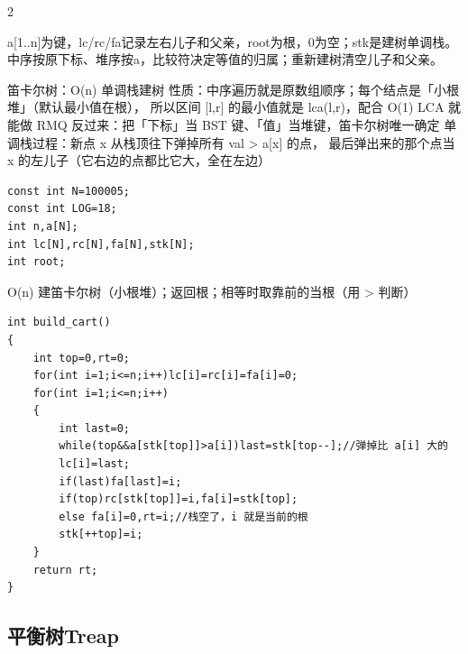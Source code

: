 \documentclass[UTF8,fontset=fandol,a4paper,twoside]{ctexart}
\newcommand{\note}[1]{{\fontsize{10}{12}\selectfont #1\par}}
\begin{document}
\begin{multicols}{2}
\note{a[\allowbreak{}1.\allowbreak{}.\allowbreak{}n]\allowbreak{}为键，lc/\allowbreak{}rc/\allowbreak{}fa记录左右儿子和父亲，root为根，0为空；stk是建树单调栈。中序按原下标、堆序按a，比较符决定等值的归属；重新建树清空儿子和父亲。}
\note{笛卡尔树：O(\allowbreak{}n)\allowbreak{} 单调栈建树 性质：中序遍历就是原数组顺序；每个结点是「小根堆」（默认最小值在根）， 所以区间 [\allowbreak{}l,\allowbreak{}r]\allowbreak{} 的最小值就是 lca(\allowbreak{}l,\allowbreak{}r)\allowbreak{}，配合 O(\allowbreak{}1)\allowbreak{} LCA 就能做 RMQ 反过来：把「下标」当 BST 键、「值」当堆键，笛卡尔树唯一确定 单调栈过程：新点 x 从栈顶往下弹掉所有 val >\allowbreak{} a[\allowbreak{}x]\allowbreak{} 的点， 最后弹出来的那个点当 x 的左儿子（它右边的点都比它大，全在左边）}
\begin{lstlisting}
const int N=100005;
const int LOG=18;
int n,a[N];
int lc[N],rc[N],fa[N],stk[N];
int root;
\end{lstlisting}
\note{O(\allowbreak{}n)\allowbreak{} 建笛卡尔树（小根堆）；返回根；相等时取靠前的当根（用 >\allowbreak{} 判断）}
\begin{lstlisting}
int build_cart()
{
    int top=0,rt=0;
    for(int i=1;i<=n;i++)lc[i]=rc[i]=fa[i]=0;
    for(int i=1;i<=n;i++)
    {
        int last=0;
        while(top&&a[stk[top]]>a[i])last=stk[top--];//弹掉比 a[i] 大的
        lc[i]=last;
        if(last)fa[last]=i;
        if(top)rc[stk[top]]=i,fa[i]=stk[top];
        else fa[i]=0,rt=i;//栈空了，i 就是当前的根
        stk[++top]=i;
    }
    return rt;
}
\end{lstlisting}
\subsection{平衡树Treap}


\end{multicols}
\end{document}

